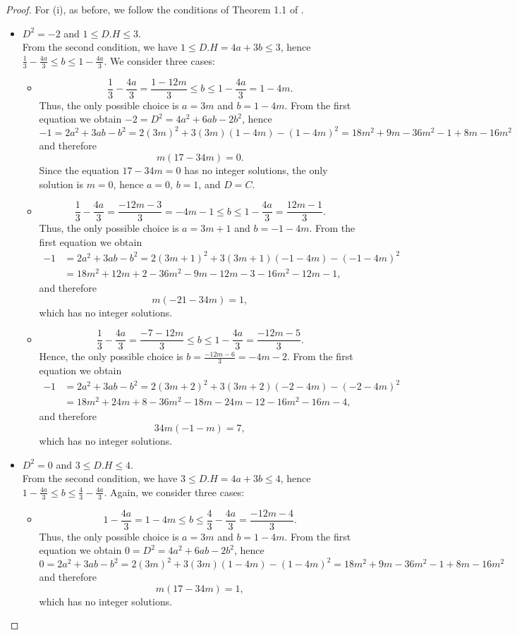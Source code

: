 \documentclass[12pt,reqno]{amsart}
\theoremstyle{plain}
\theoremstyle{definition}
\theoremstyle{remark}
\theoremstyle{definition}
\begin{document}
\begin{proof}
For (i), as before, we follow the conditions of Theorem 1.1 of \cite{kwa}.
\begin{itemize}
        \item $D^{2}=-2$ and $1\leq D.H\leq 3$.\\
    From the second condition, we have $1\leq D.H=4a+3b\leq 3$, hence
    $\frac{1}{3}-\frac{4a}{3}\leq b\leq 1-\frac{4a}{3}$. We consider three cases:
    \begin{itemize}
        \item[$a=3m$]  
        $$\frac{1}{3}-\frac{4a}{3}=\frac{1-12m}{3}\leq b \leq 1-\frac{4a}{3}=1-4m.$$
        Thus, the only possible choice is $a=3m$ and $b=1-4m$. From the first equation we obtain
        $-2=D^{2}=4a^{2}+6ab-2b^{2}$, hence
        $$-1=2a^{2}+3ab-b^{2}=2(3m)^{2}+3(3m)(1-4m)-(1-4m)^{2}=18m^{2}+9m-36m^{2}-1+8m-16m^{2}$$
        and therefore
        $$m(17-34m)=0.$$
        Since the equation $17-34m=0$ has no integer solutions, the only solution is $m=0$, hence $a=0$, $b=1$, and $D=C$.

        \item[$a=3m+1$] 
        $$\frac{1}{3}-\frac{4a}{3}=\frac{-12m-3}{3}=-4m-1\leq b \leq 1-\frac{4a}{3}=\frac{12m-1}{3}.$$
        Thus, the only possible choice is $a=3m+1$ and $b=-1-4m$. From the first equation we obtain
\begin{align*}
    -1&=2a^{2}+3ab-b^{2}=2(3m+1)^{2}+3(3m+1)(-1-4m)-(-1-4m)^{2}\\
    &=18m^{2}+12m+2-36m^{2}-9m-12m-3-16m^{2}-12m-1,
\end{align*}
and therefore
$$m(-21-34m)=1,$$
which has no integer solutions.

        \item[$a=3m+2$] 
        $$\frac{1}{3}-\frac{4a}{3}=\frac{-7-12m}{3}\leq b \leq 1-\frac{4a}{3}=\frac{-12m-5}{3}.$$
        Hence, the only possible choice is $b=\frac{-12m-6}{3}=-4m-2$. From the first equation we obtain
\begin{align*}
    -1&=2a^{2}+3ab-b^{2}=2(3m+2)^{2}+3(3m+2)(-2-4m)-(-2-4m)^{2}\\
    &=18m^{2}+24m+8-36m^{2}-18m-24m-12-16m^{2}-16m-4,
\end{align*}
and therefore
$$34m(-1-m)=7,$$
which has no integer solutions.
\end{itemize}

        \item $D^{2}=0$ and $3\leq D.H \leq 4$. \\
        From the second condition, we have $3\leq D.H=4a+3b\leq 4$, hence
        $1-\frac{4a}{3}\leq b\leq \frac{4}{3}-\frac{4a}{3}$. Again, we consider three cases:
\begin{itemize}
        \item[$a=3m$]  
        $$1-\frac{4a}{3}=1-4m\leq b \leq\frac{4}{3}-\frac{4a}{3}=\frac{-12m-4}{3}.$$
        Thus, the only possible choice is $a=3m$ and $b=1-4m$. From the first equation we obtain
        $0=D^{2}=4a^{2}+6ab-2b^{2}$, hence
        $$0=2a^{2}+3ab-b^{2}=2(3m)^{2}+3(3m)(1-4m)-(1-4m)^{2}=18m^{2}+9m-36m^{2}-1+8m-16m^{2}$$
        and therefore
        $$m(17-34m)=1,$$
        which has no integer solutions.


\end{itemize}
\end{itemize}
\end{proof}
\end{document}
